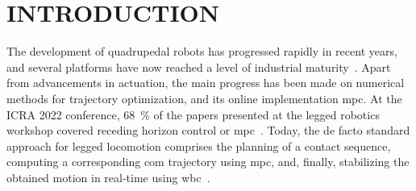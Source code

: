 \section{INTRODUCTION}%





The development of quadrupedal robots has progressed rapidly in recent years, and several platforms have now reached a level of industrial maturity~\cite{hutter_anymal_2017,boston_dynamics_boston_2024,ghost_robotics_ghost_2024}. 
Apart from advancements in actuation, the main progress has been made on numerical methods for trajectory optimization, and its online implementation \gls{mpc}. 
At the ICRA 2022 conference, \qty{68}{\percent} of the papers presented at the legged robotics workshop covered receding horizon control or \acrshort{mpc}~\cite{katayama_model_2023}. 
Today, the de facto standard approach for legged locomotion comprises the planning of a contact sequence, computing a corresponding \gls{com} trajectory using \gls{mpc}, and, finally, stabilizing the obtained motion in real-time using \gls{wbc}~\cite{carpentier_recent_2021}. 

